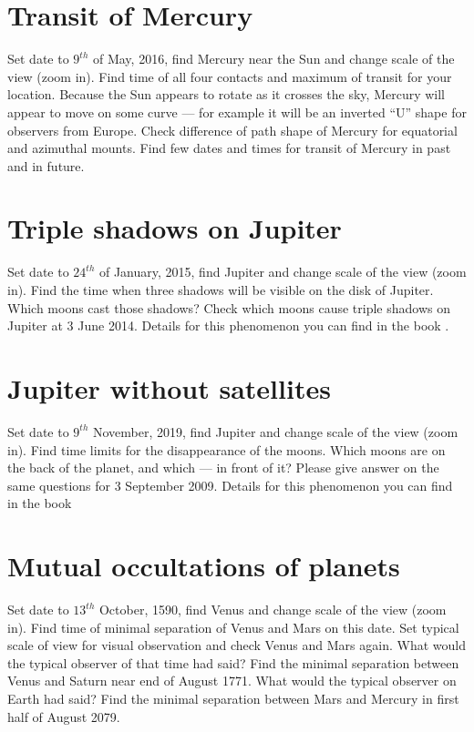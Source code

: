 \section{Transit of Mercury}
\label{sec:Exercises:TransitOfMercury}

Set date to $9^{th}$ of May, 2016, find Mercury near the Sun and 
change scale of the view (zoom in). Find time of all four contacts and 
maximum of transit for your location. Because the Sun appears 
to rotate as it crosses the sky, Mercury will appear to move 
on some curve --- for example it will be an inverted ``U'' shape 
for observers from Europe. Check difference of path shape of 
Mercury for equatorial and azimuthal mounts. Find few dates and 
times for transit of Mercury in past and in future.

\section{Triple shadows on Jupiter}
\label{sec:Exercises:TripleShadowsOnJupiter}

Set date to $24^{th}$ of January, 2015, find Jupiter and change 
scale of the view (zoom in). Find the time when three shadows will be 
visible on the disk of Jupiter. Which moons cast those shadows? 
Check which moons cause triple shadows on Jupiter at 3 
June 2014. Details for this phenomenon you can find in the book 
.

\section{Jupiter without satellites}
\label{sec:Exercises:JupiterWithoutSatellites}

Set date to $9^{th}$ November, 2019, find Jupiter and change 
scale of the view (zoom in). Find time limits for the disappearance 
of the moons. Which moons are on the back of the planet, and 
which --- in front of it? Please give answer on the same 
questions for 3 September 2009. Details for this phenomenon 
you can find in the book 

\section{Mutual occultations of planets}
\label{sec:Exercises:MutualOccultationsOfPlanets}

Set date to $13^{th}$ October, 1590, find Venus and change 
scale of the view (zoom in). Find time of minimal separation of 
Venus and Mars on this date. Set typical scale of view 
for visual observation and check Venus and Mars again. 
What would the typical observer of that time had said? Find 
the minimal separation between Venus and Saturn near end 
of August 1771. What would the typical observer on 
Earth had said? Find the minimal separation between Mars and 
Mercury in first half of August 2079. 

